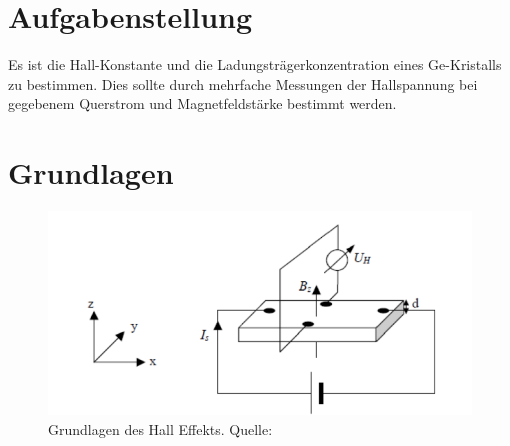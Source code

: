 \documentclass{article}
\begin{document}
\parindent0cm




\tableofcontents
\newpage

\pagestyle{fancy}

\section{Aufgabenstellung}

Es ist die Hall-Konstante und die Ladungsträgerkonzentration eines Ge-Kristalls zu bestimmen. Dies sollte durch mehrfache Messungen der Hallspannung bei gegebenem Querstrom und Magnetfeldstärke bestimmt werden.



\section{Grundlagen}


\begin{figure}[H]
\includegraphics[scale=1.4]{versuch2.png}
\caption{Grundlagen des Hall Effekts. Quelle: \cite{moodle}}
\label{fig:grundlagen}
\end{figure}
\end{document}
